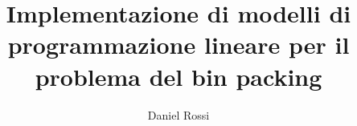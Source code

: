\title{Implementazione di modelli di programmazione lineare per il problema del bin packing}
\author{Daniel Rossi}



